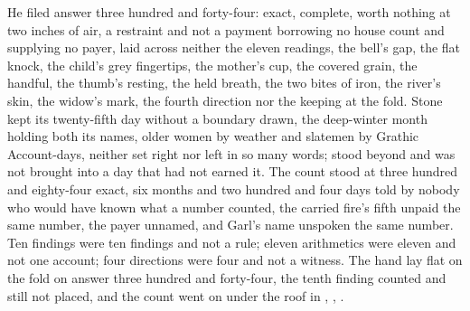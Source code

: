He filed answer three hundred and forty-four: exact, complete, worth nothing at two inches of air, a restraint and not a payment borrowing no house count and supplying no payer, laid across neither the eleven readings, the bell's gap, the flat knock, the child's grey fingertips, the mother's cup, the covered grain, the handful, the thumb's resting, the held breath, the two bites of iron, the river's skin, the widow's mark, the fourth direction nor the keeping at the fold. Stone kept its twenty-fifth day without a boundary drawn, the deep-winter month holding both its names, older women by weather and slatemen by Grathic Account-days, neither set right nor left in so many words;  stood beyond and was not brought into a day that had not earned it. The count stood at three hundred and eighty-four exact, six months and two hundred and four days told by nobody who would have known what a number counted, the carried fire's fifth unpaid the same number, the payer unnamed, and Garl's name unspoken the same number. Ten findings were ten findings and not a rule; eleven arithmetics were eleven and not one account; four directions were four and not a witness. The hand lay flat on the fold on answer three hundred and forty-four, the tenth finding counted and still not placed, and the count went on under the roof in , , .
